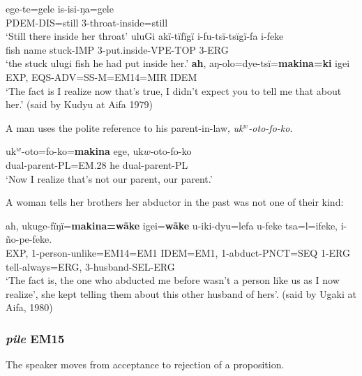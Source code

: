 \documentclass[output=paper]{langsci/langscibook}
\begin{document}
\begin{exe}
\ex \label{ex:eb35}
	\begin{xlist}
	\ex \label{ex:eb35a}
	\gll ege-te=gele is-isi-ŋa=gele\\
	PDEM-DIS=still 3-throat-inside=still\\
	\trans ‘Still there inside her throat’
	\ex \label{ex:eb35b}
	\gll uluGi akï-tïfïgï i-fu-tsï-tsïgï-fa i-feke\\
	{fish name} stuck-IMP 3-put.inside-VPE-TOP 3-ERG\\
	\trans ‘the stuck ulugi fish he had put inside her.’
	\ex \label{ex:eb35c}
	\gll \textbf{ah}, aŋ-olo=dye-tsï=\textbf{makina=ki} igei\\ %
	EXP, EQS-ADV=SS-M=EM14=MIR IDEM\\
	\trans ‘The fact is I realize now that’s true,  I didn’t expect you to tell me that about her.’ (said by Kudyu at Aifa 1979)
\end{xlist}
\end{exe}

A man uses the polite reference to his parent-in-law, \textit{uk$^w$-oto-fo-ko}. 

\begin{exe}
	\ex \label{ex:eb36}
	\gll uk$^w$-oto=fo-ko=\textbf{makina} ege, uk$w$-oto-fo-ko\\
	dual-parent-PL=EM.28 he dual-parent-PL\\
	\trans ‘Now I realize that’s not our parent, our parent.’
\end{exe}

A woman tells her brothers her abductor in the past was not one of their kind:

\begin{exe}
	\ex \label{ex:eb37}
	\gll ah, ukuge-fïŋï=\textbf{makina=wãke} igei=\textbf{wãke} u-iki-dyu=lefa u-feke tsa=l=ifeke, i-ño-pe-feke.\\
	EXP, 1-person-unlike=EM14=EM1   IDEM=EM1, 1-abduct-PNCT=SEQ     1-ERG   tell-always=ERG,  3-husband-SEL-ERG\\
	\trans ‘The fact is, the one who abducted me before wasn’t a person like us as I now realize’, she kept telling them about this other husband of hers’. (said by Ugaki at Aifa, 1980)
\end{exe}


\subsubsection{\textit{pile} EM15}  The speaker moves from acceptance to rejection of a proposition.
\end{document}
